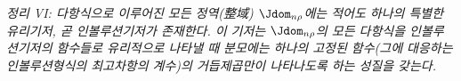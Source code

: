 
\emph{정리 VI: 다항식으로 이루어진 모든 정역(整域) $\Jdom_{n\rho}$에는 적어도 하나의 특별한 유리기저, 곧 인볼루션기저가 존재한다. 이 기저는 $\Jdom_{n\rho}$의 모든 다항식을 인볼루션기저의 함수들로 유리적으로 나타낼 때 분모에는 하나의 고정된 함수(그에 대응하는 인볼루션형식의 최고차항의 계수)의 거듭제곱만이 나타나도록 하는 성질을 갖는다.}
